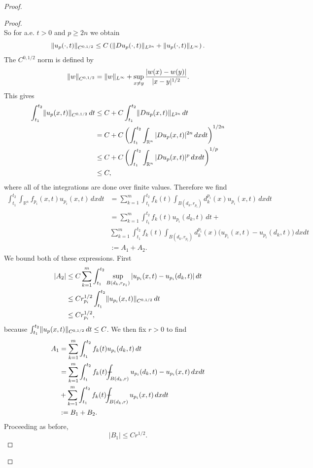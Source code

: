 \documentclass{article}
\DeclarePairedDelimiter{\norm}{\lVert}{\rVert}
\def\Xint#1{\mathchoice
{\XXint\displaystyle\textstyle{#1}}%
{\XXint\textstyle\scriptstyle{#1}}%
{\XXint\scriptstyle\scriptscriptstyle{#1}}%
{\XXint\scriptscriptstyle\scriptscriptstyle{#1}}%
\!\int}
\def\XXint#1#2#3{{\setbox0=\hbox{$#1{#2#3}{\int}$ }
\vcenter{\hbox{$#2#3$ }}\kern-.6\wd0}}
\def\dashint{\Xint-}
\begin{document}
\begin{flushleft}
\begin{proof}
\begin{proof}
\begin{equation}
\end{equation}
So for a.e. $t > 0$ and $p\geq 2n$ we obtain
$$\norm{u_p(\cdot,t)}_{C^{0,1/2}} \leq C\left(\norm{Du_p(\cdot,t)}_{L^{2n}}+\norm{u_p(\cdot,t)}_{L^{\infty}}\right).$$
The $C^{0,1/2}$ norm is defined by
$$\norm{w}_{C^{0,1/2}}=\norm{w}_{L^{\infty}}+\sup_{x\neq y}\frac{|w(x)-w(y)|}{|x-y|^{1/2}
}.$$
This gives
\begin{align*}
    \int_{t_1}^{t_2} \norm{u_p(x,t)}_{C^{0,1/2}}\,dt &\leq
    C + C\int_{t_1}^{t_2}\norm{Du_p(x,t)}_{L^{2n}}\,dt\\&=
    C + C\left(\int_{t_1}^{t_2}\int_{\mathbb R^n}|Du_p(x,t)|^{2n}\,dxdt\right)^{1/2n}\\&\leq
    C + C\left(\int_{t_1}^{t_2}\int_{\mathbb R^n}|Du_p(x,t)|^{p}\,dxdt\right)^{1/p}\\&\leq C,
\end{align*}
where all of the integrations are done over finite values. Therefore we find
\begin{align*}
\int_{t_1}^{t_2} \int_{\mathbb R^n} f_{p_i}(x,t)u_{p_i}(x,t)\,dxdt&=\sum_{k=1}^m \int_{t_1}^{t_2} f_k(t) \int_{B(d_k, r_{p_i})} d_k^{p_i}(x)u_{p_i}(x,t)\,dxdt\\&=
\sum_{k=1}^m \int_{t_1}^{t_2} f_k(t)u_{p_i}(d_k,t)\,dt + \\&
\sum_{k=1}^m \int_{t_1}^{t_2} f_k(t) \int_{B(d_k, r_{p_i})}d_k^{p_i}(x)\Big(u_{p_i}(x,t) - u_{p_i}(d_k,t)\Big)\,dxdt \\&:= A_1 + A_2.
\end{align*}
We bound both of these expressions. First
\begin{align*}
|A_2| &\leq C \sum_{k=1}^m \int_{t_1}^{t_2}\sup_{B(d_k,r_{p_i})}|u_{p_i}(x,t)- u_{p_i}(d_k,t)|\,dt \\ &\leq
Cr_{p_i}^{1/2}\int_{t_1}^{t_2}\norm{u_{p_i}(x,t)}_{C^{0,1/2}}\,dt\\&\leq
Cr_{p_i}^{1/2},
\end{align*}
because  $\int_{t_1}^{t_2} \norm{u_p(x,t)}_{C^{0,1/2}}\,dt\leq C$. We then fix $r>0$ to find
\begin{align*}
    A_1 &= \sum_{k=1}^m \int_{t_1}^{t_2} f_k(t)u_{p_i}(d_k,t)\,dt\\&=
    \sum_{k=1}^m \int_{t_1}^{t_2} f_k(t) \dashint_{B(d_k,r)}u_{p_i}(d_k,t)-u_{p_i}(x,t)\,dxdt\\&+
    \sum_{k=1}^m \int_{t_1}^{t_2} f_k(t) \dashint_{B(d_k,r)}u_{p_i}(x,t)\,dxdt \\&:= B_1+B_2.
\end{align*}
Proceeding as before,
$$|B_1|\leq Cr^{1/2}.$$

\end{proof}
\end{proof}
\end{flushleft}
\end{document}
